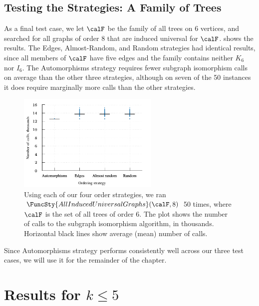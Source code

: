 \subsection{Testing the Strategies: A Family of Trees}

As a final test case, we let $\calF$ be the family of all trees on 6 vertices,
and searched for all graphs of order 8 that are induced universal for $\calF$.
 shows the results. The Edges, Almost-Random,
and Random strategies had identical results, since all members of $\calF$ have five
edges and the family contains neither $K_6$ nor $I_6$.  The Automorphisms strategy
requires fewer subgraph isomorphism calls on average than the other three strategies,
although on seven of the 50 instances it does require marginally more calls than
the other strategies.

\begin{figure}[htb]
    \centering

    \includegraphics*[width=0.601\textwidth]{15-universal-graphs/img/second-experiment-plot-using-trees}

    \caption{Using each of our four order strategies, we ran
        $\FuncSty{AllInducedUniversalGraphs}(\calF,8)$ 50 times, where
        $\calF$ is the set of all trees of order 6. The plot
        shows the number of calls to the subgraph isomorphism algorithm, in thousands.
        Horizontal black lines show average (mean) number of calls.}
\label{fig:second-experiment-using-trees}
\end{figure}

Since Automorphisms strategy performs consistently well across our three test
cases, we will use it for the remainder of the chapter.

\section{Results for \texorpdfstring{$k \leq 5$}{k<=5}}\label{sec:results5}

